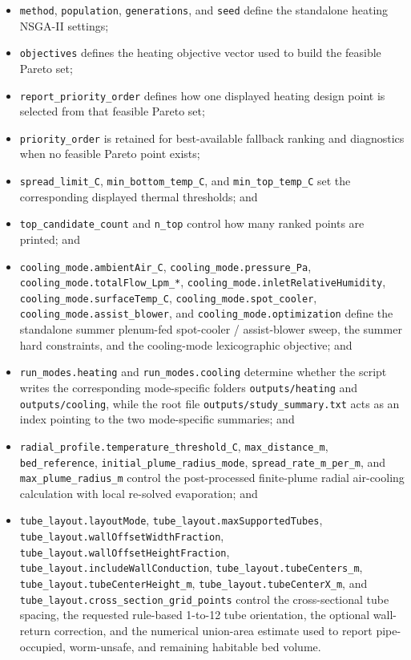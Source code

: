 \documentclass{article}
\begin{document}
\begin{itemize}
\item \texttt{method}, \texttt{population}, \texttt{generations}, and
      \texttt{seed} define the standalone heating NSGA-II settings;
\item \texttt{objectives} defines the heating objective vector used to build
      the feasible Pareto set;
\item \texttt{report\_priority\_order} defines how one displayed heating
      design point is selected from that feasible Pareto set;
\item \texttt{priority\_order} is retained for best-available fallback
      ranking and diagnostics when no feasible Pareto point exists;
\item \texttt{spread\_limit\_C}, \texttt{min\_bottom\_temp\_C}, and
      \texttt{min\_top\_temp\_C} set the corresponding displayed thermal
      thresholds; and
\item \texttt{top\_candidate\_count} and \texttt{n\_top} control how many
      ranked points are printed; and
\item \texttt{cooling\_mode.ambientAir\_C},
      \texttt{cooling\_mode.pressure\_Pa},
      \texttt{cooling\_mode.totalFlow\_Lpm\_*},
      \texttt{cooling\_mode.inletRelativeHumidity},
      \texttt{cooling\_mode.surfaceTemp\_C},
      \texttt{cooling\_mode.spot\_cooler},
      \texttt{cooling\_mode.assist\_blower}, and
      \texttt{cooling\_mode.optimization} define the standalone summer
      plenum-fed spot-cooler / assist-blower sweep, the summer hard constraints, and the
      cooling-mode lexicographic objective; and
\item \texttt{run\_modes.heating} and \texttt{run\_modes.cooling} determine
      whether the script writes the corresponding mode-specific folders
      \texttt{outputs/heating} and \texttt{outputs/cooling}, while the root
      file \texttt{outputs/study\_summary.txt} acts as an index pointing to
      the two mode-specific summaries; and
\item \texttt{radial\_profile.temperature\_threshold\_C},
      \texttt{max\_distance\_m}, \texttt{bed\_reference},
      \texttt{initial\_plume\_radius\_mode},
      \texttt{spread\_rate\_m\_per\_m}, and
      \texttt{max\_plume\_radius\_m} control the post-processed finite-plume
      radial air-cooling calculation with local re-solved evaporation; and
\item \texttt{tube\_layout.layoutMode},
      \texttt{tube\_layout.maxSupportedTubes},
      \texttt{tube\_layout.wallOffsetWidthFraction},
      \texttt{tube\_layout.wallOffsetHeightFraction},
      \texttt{tube\_layout.includeWallConduction},
      \texttt{tube\_layout.tubeCenters\_m},
      \texttt{tube\_layout.tubeCenterHeight\_m},
      \texttt{tube\_layout.tubeCenterX\_m}, and
      \texttt{tube\_layout.cross\_section\_grid\_points} control the
      cross-sectional tube spacing, the requested rule-based 1-to-12 tube
      orientation, the optional wall-return correction, and the numerical
      union-area estimate used to report pipe-occupied, worm-unsafe, and
      remaining habitable bed volume.
\end{itemize}
\end{document}
